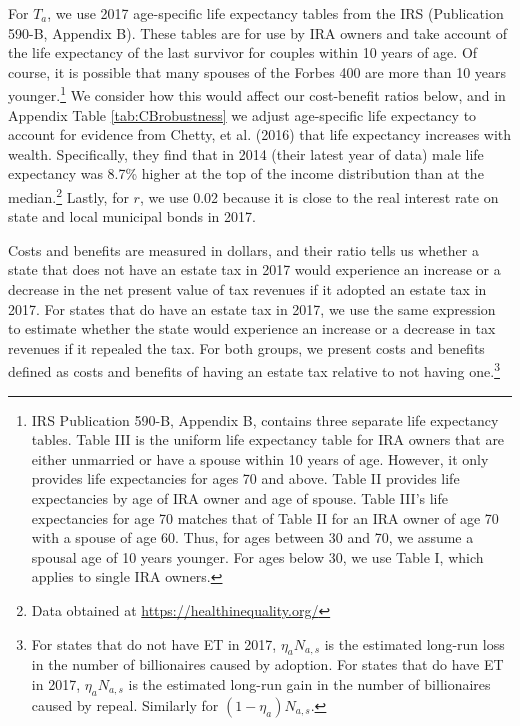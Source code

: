 \documentclass[12pt]{article}
\begin{document}
For $T_a$, we use 2017 age-specific life expectancy tables from the IRS (Publication 590-B, Appendix B). These tables are for use by IRA owners and take account of the life expectancy of the last survivor for couples within 10 years of age. Of course, it is possible that many spouses of the Forbes 400 are more than 10 years younger.\footnote{IRS Publication 590-B, Appendix B, contains three separate life expectancy tables. Table III is the uniform life expectancy table for IRA owners that are either unmarried or have a spouse within 10 years of age. However, it only provides life expectancies for ages 70 and above. Table II provides life expectancies by age of IRA owner and age of spouse. Table III's life expectancies for age 70 matches that of Table II for an IRA owner of age 70 with a spouse of age 60. Thus, for ages between 30 and 70, we assume a spousal age of 10 years younger. For ages below 30, we use Table I, which applies to single IRA owners.} We consider how this would affect our cost-benefit ratios below, and in Appendix Table \ref{tab:CBrobustness} we adjust age-specific life expectancy to account for evidence from Chetty, et al. (2016) that life expectancy increases with wealth. Specifically, they find that in 2014 (their latest year of data) male life expectancy was 8.7\% higher at the top of the income distribution than at the median.\footnote{Data obtained at \url{https://healthinequality.org/}} Lastly, for $r$, we use 0.02 because it is close to the real interest rate on state and local municipal bonds in 2017. 

Costs and benefits are measured in dollars, and their ratio tells us whether a state that does not have an estate tax in 2017 would experience an increase or a decrease in the net present value of tax revenues if it adopted an estate tax in 2017.  For states that do have an estate tax in 2017, we use the same expression to estimate whether the state would experience an increase or a decrease in tax revenues if it repealed the tax. For both groups, we present costs and benefits defined as costs and benefits of having an estate tax relative to not having one.\footnote{For states that do not have ET in 2017, $\eta_a N_{a,s}$ is the estimated long-run loss in the number of billionaires caused by adoption.  For states that do  have ET in 2017, $\eta_a N_{a,s}$ is the estimated long-run gain in the number of billionaires caused by repeal.  Similarly for $(1 - \eta_a) N_{a,s}$. }
\end{document}
